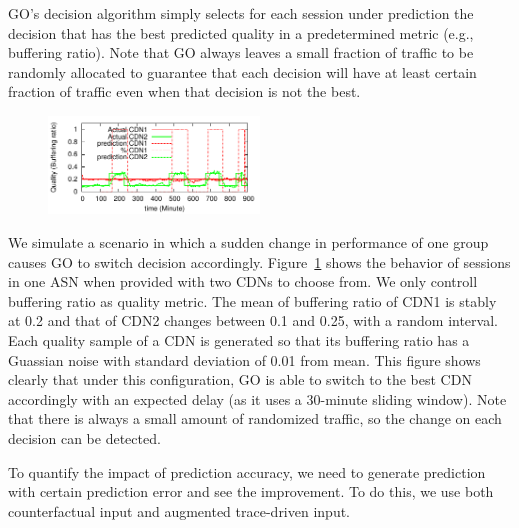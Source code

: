  GO's decision algorithm simply selects for each session under prediction the decision that has the best predicted quality in a predetermined metric (e.g., buffering ratio). Note that GO always leaves a small fraction of traffic to be randomly allocated to guarantee that each decision will have at least certain fraction of traffic even when that decision is not the best.


\begin{figure}[h!]
\centering
 \includegraphics[width=0.5\textwidth] {figures/behavior-evaluation/simple-change.pdf}
\label{fig:behavioral}
\end{figure}

 We simulate a scenario in which a sudden change in performance of one group causes GO to switch decision accordingly. Figure~\ref{fig:behavioral} shows the behavior of sessions in one ASN when provided with two CDNs to choose from. We only controll buffering ratio as quality metric. The mean of buffering ratio of CDN1 is stably at 0.2 and that of CDN2 changes between 0.1 and 0.25, with a random interval. Each quality sample of a CDN is generated so that its buffering ratio has a Guassian noise with standard deviation of 0.01 from mean. This figure shows clearly that under this configuration, GO is able to switch to the best CDN accordingly with an expected delay (as it uses a 30-minute sliding window). Note that there is always a small amount of randomized traffic, so the change on each decision can be detected. %



To quantify the impact of prediction accuracy, we need to generate prediction with certain prediction error and see the improvement. To do this, we use both counterfactual input and augmented trace-driven input. 

